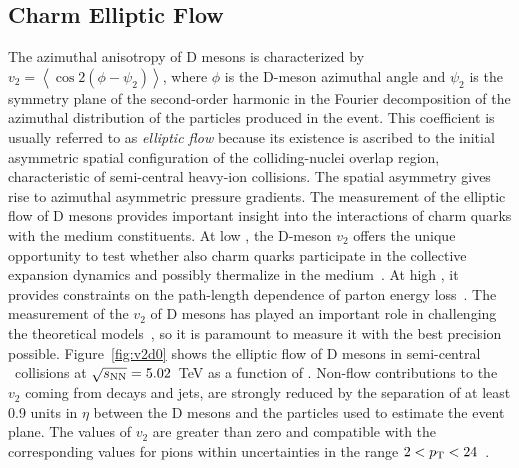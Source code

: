 \documentclass[10pt]{article}
\begin{document}
\subsection{Charm Elliptic Flow}
The azimuthal anisotropy of D mesons is characterized by $v_2= \left<\cos 2(\phi - \psi_2)\right>$, where $\phi$ is the D-meson azimuthal angle and $\psi_2$ is the symmetry plane of the second-order
harmonic in the Fourier decomposition of the azimuthal distribution of the particles produced in the event.
This coefficient is usually referred to as \emph{elliptic flow} because its existence is ascribed to the initial asymmetric spatial configuration of the colliding-nuclei overlap region, characteristic of semi-central heavy-ion collisions.
The spatial asymmetry gives rise to azimuthal asymmetric pressure gradients.
The measurement of the elliptic flow of D mesons provides important insight into the interactions of charm quarks with the
medium constituents. At low \pt, the D-meson $v_2$ offers the unique opportunity to test whether also charm quarks participate in
the collective expansion dynamics and possibly thermalize in the medium~\cite{Greco:2003}. At high \pt, it provides constraints on the path-length dependence of parton energy loss~\cite{Gyulassy:2000}.
The measurement of the $v_2$ of D mesons has played an important role in challenging
the theoretical models~\cite{Das:2015}, so it is paramount to measure it with the best precision possible.
Figure~\ref{fig:v2d0} shows the elliptic flow of D mesons in semi-central \PbPb\ collisions at $\sqrt{s_{\rm NN}}=5.02$~TeV as a function of \pt.
Non-flow contributions to the $v_2$ coming from decays and jets, are strongly
reduced by the separation of at least 0.9 units in $\eta$ between the D mesons and the particles used
to estimate the event plane. 
The values of $v_2$ are greater than zero and compatible with the corresponding values for pions within uncertainties in the range $2<p_{\rm T}<24$~\GeVc.
\end{document}
